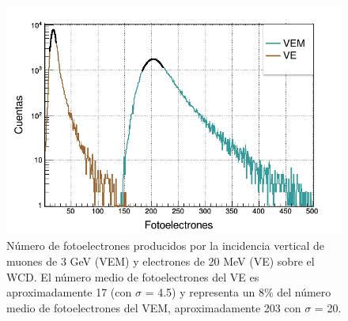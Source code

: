 \documentclass[12pt,oneside,openany,letter]{book}
\begin{document}
\begin{figure}[h]
    \centering
        \includegraphics[scale=0.45]{images/vem_vee.png}
   \caption[Número de fotoelectrones producidos por la incidencia vertical de muones de 3 GeV (VEM) y electrones de 20 MeV (VE) sobre el WCD]{Número de fotoelectrones producidos por la incidencia vertical de muones de 3 GeV (VEM) y electrones de 20 MeV (VE) sobre el WCD. El número medio de fotoelectrones del VE es aproximadamente 17 (con $\sigma$ = 4.5) y representa un 8\% del número medio de fotoelectrones del VEM, aproximadamente 203 con   $\sigma$ = 20.}\label{vem_vee}
\end{figure}
\end{document}
